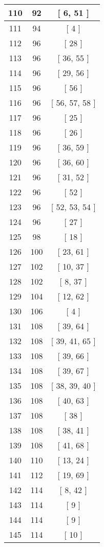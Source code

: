 \begin{center}
\begin{longtable}[H]{|| c c c ||}
\hline
110 & 92 & [ 6, 51 ] \\ 
\hline
111 & 94 & [ 4 ] \\ 
\hline
112 & 96 & [ 28 ] \\ 
\hline
113 & 96 & [ 36, 55 ] \\ 
\hline
114 & 96 & [ 29, 56 ] \\ 
\hline
115 & 96 & [ 56 ] \\ 
\hline
116 & 96 & [ 56, 57, 58 ] \\ 
\hline
117 & 96 & [ 25 ] \\ 
\hline
118 & 96 & [ 26 ] \\ 
\hline
119 & 96 & [ 36, 59 ] \\ 
\hline
120 & 96 & [ 36, 60 ] \\ 
\hline
121 & 96 & [ 31, 52 ] \\ 
\hline
122 & 96 & [ 52 ] \\ 
\hline
123 & 96 & [ 52, 53, 54 ] \\ 
\hline
124 & 96 & [ 27 ] \\ 
\hline
125 & 98 & [ 18 ] \\ 
\hline
126 & 100 & [ 23, 61 ] \\ 
\hline
127 & 102 & [ 10, 37 ] \\ 
\hline
128 & 102 & [ 8, 37 ] \\ 
\hline
129 & 104 & [ 12, 62 ] \\ 
\hline
130 & 106 & [ 4 ] \\ 
\hline
131 & 108 & [ 39, 64 ] \\ 
\hline
132 & 108 & [ 39, 41, 65 ] \\ 
\hline
133 & 108 & [ 39, 66 ] \\ 
\hline
134 & 108 & [ 39, 67 ] \\ 
\hline
135 & 108 & [ 38, 39, 40 ] \\ 
\hline
136 & 108 & [ 40, 63 ] \\ 
\hline
137 & 108 & [ 38 ] \\ 
\hline
138 & 108 & [ 38, 41 ] \\ 
\hline
139 & 108 & [ 41, 68 ] \\ 
\hline
140 & 110 & [ 13, 24 ] \\ 
\hline
141 & 112 & [ 19, 69 ] \\ 
\hline
142 & 114 & [ 8, 42 ] \\ 
\hline
143 & 114 & [ 9 ] \\ 
\hline
144 & 114 & [ 9 ] \\ 
\hline
145 & 114 & [ 10 ] \\ 

\end{longtable}
\end{center}
